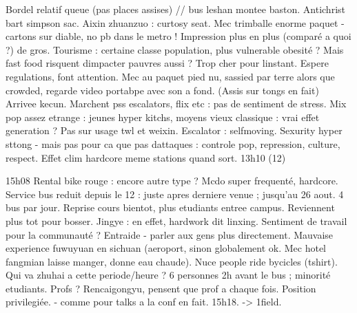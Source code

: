 Bordel relatif queue (pas places assises) // bus leshan montee baston.
Antichrist bart simpson sac. Aixin zhuanzuo : curtosy seat.
Mec trimballe enorme paquet - cartons sur diable, no pb dans le metro ! Impression plus en plus (comparé a quoi ?) de gros. Tourisme : certaine classe population, plus vulnerable obesité ? Mais fast food risquent dimpacter pauvres aussi ? Trop cher pour linstant. Espere regulations, font attention.
Mec au paquet pied nu, sassied par terre alors que crowded, regarde video portabpe avec son a fond. (Assis sur tongs en fait)
Arrivee kecun.
Marchent pss escalators, flix etc : pas de sentiment de stress.
Mix pop assez etrange : jeunes hyper kitchs, moyens vieux classique : vrai effet generation ?
Pas sur usage twl et weixin.
Escalator : selfmoving. Sexurity hyper sttong - mais pas pour ca que pas dattaques : controle pop, repression, culture, respect. Effet clim hardcore meme stations quand sort.
13h10 (12)


15h08
Rental bike rouge : encore autre type ? Mcdo super frequenté, hardcore.
Service bus reduit depuis le 12 : juste apres derniere venue ; jusqu'au 26 aout. 4 bus par jour. Reprise cours bientot, plus etudiants entree campus. Reviennent plus tot pour bosser. Jingye : en effet, hardwork dit linxing. Sentiment de travail pour la communauté ? Entraide - parler aux gens plus directement.
Mauvaise experience fuwuyuan en sichuan (aeroport, sinon globalement ok. Mec hotel fangmian laisse manger, donne eau chaude). Nuce people ride bycicles (tshirt). Qui va zhuhai a cette periode/heure ? 6 personnes 2h avant le bus ; minorité etudiants. Profs ?
Rencaigongyu, pensent que prof a chaque fois. Position privilegiée. - comme pour talks a la conf en fait.
15h18.
-> 1field.

